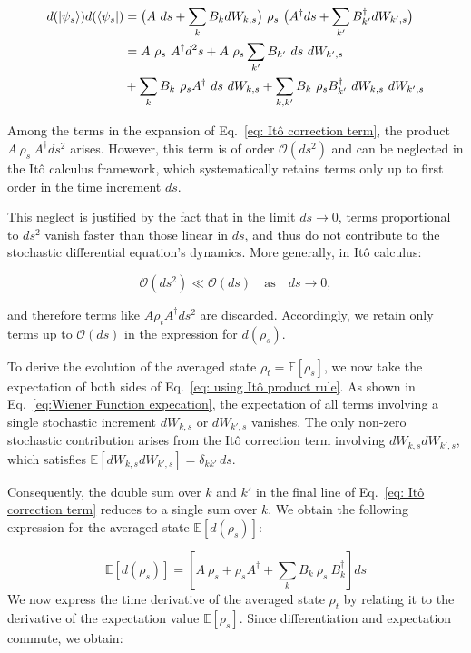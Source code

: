 \documentclass[9pt,a4paper,twocolumn,twoside]{tau-class/tau}
\begin{document}
\begin{align}
    d(\ket{\psi_s}) d(\bra{\psi_s}) &= \big(A\ ds+\sum_k B_kdW_{k,s}\big)\ \rho_s \ \big(A^\dagger ds+\sum_{k'} B^\dagger_{k'} dW_{k',s}\big) \notag \\
    &= A\ \rho_s \ A^\dagger d^2s + A \ \rho_s \sum_{k'} B_{k'} \ ds \ dW_{k',s} \notag\\ &+ \sum_{k} B_k \ \rho_s A^\dagger \ ds \ dW_{k,s} + \sum_{k,k'} B_k \ \rho_s B^\dagger_{k'} \ dW_{k,s}\ dW_{k',s} \label{eq: Itô correction term}
\end{align}



Among the terms in the expansion of Eq.~\eqref{eq: Itô correction term}, the product $A \ \rho_s \ A^\dagger ds^2$ arises. However, this term is of order $\mathcal{O}(ds^2)$ and can be neglected in the Itô calculus framework, which systematically retains terms only up to first order in the time increment $ds$. 

This neglect is justified by the fact that in the limit $ds \to 0$, terms proportional to $ds^2$ vanish faster than those linear in $ds$, and thus do not contribute to the stochastic differential equation's dynamics. More generally, in Itô calculus:

\begin{equation}
    \mathcal{O}(ds^2) \ll \mathcal{O}(ds) \quad \text{as} \quad ds \to 0,
\end{equation}

and therefore terms like $A \rho_t A^\dagger ds^2$ are discarded.
Accordingly, we retain only terms up to $\mathcal{O}(ds)$ in the expression for $d(\rho_s)$. 

To derive the evolution of the averaged state \( \rho_t = \mathbb{E}[\rho_s] \), we now take the expectation of both sides of Eq.~\eqref{eq: using Itô product rule}. As shown in Eq.~\eqref{eq:Wiener Function expecation}, the expectation of all terms involving a single stochastic increment \( dW_{k,s} \) or \( dW_{k',s} \) vanishes. The only non-zero stochastic contribution arises from the Itô correction term involving \( dW_{k,s} dW_{k',s} \), which satisfies $\mathbb{E}[dW_{k,s} dW_{k',s}] = \delta_{kk'}\, ds.$

Consequently, the double sum over \( k \) and \( k' \) in the final line of Eq.~\eqref{eq: Itô correction term} reduces to a single sum over \( k \). We obtain the following expression for the averaged state $\mathbb{E}[d(\rho_s)]$:

\begin{equation}
    \mathbb{E}[d(\rho_s)] = [A \ \rho_s + \rho_s A^\dagger + \sum_k B_k \ \rho_s \ B_k^\dagger] ds
    \label{eq: average over pure state}
\end{equation}
We now express the time derivative of the averaged state \( \rho_t \) by relating it to the derivative of the expectation value \( \mathbb{E}[\rho_s] \). Since differentiation and expectation commute, we obtain:
\end{document}
